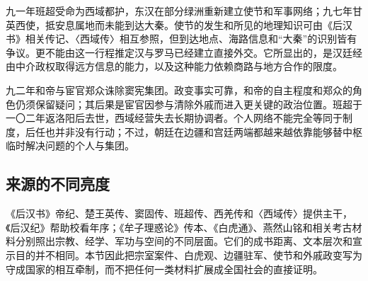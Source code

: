 九一年班超受命为西域都护，东汉在部分绿洲重新建立使节和军事网络；九七年甘英西使，抵安息属地而未能到达大秦。使节的发生和所见的地理知识可由《后汉书》相关传记、〈西域传〉相互参照，但到达地点、海路信息和“大秦”的识别皆有争议。更不能由这一行程推定汉与罗马已经建立直接外交。它所显出的，是汉廷经由中介政权取得远方信息的能力，以及这种能力依赖商路与地方合作的限度。

九二年和帝与宦官郑众诛除窦宪集团。政变事实可靠，和帝的自主程度和郑众的角色仍须保留疑问；其后果是宦官因参与清除外戚而进入更关键的政治位置。班超于一〇二年返洛阳后去世，西域经营失去长期协调者。个人网络不能完全等同于制度，后任也并非没有行动；不过，朝廷在边疆和宫廷两端都越来越依靠能够替中枢临时解决问题的个人与集团。

\subsection{来源的不同亮度}

《后汉书》帝纪、楚王英传、窦固传、班超传、西羌传和〈西域传〉提供主干，《后汉纪》帮助校看年序；《牟子理惑论》传本、《白虎通》、燕然山铭和相关考古材料分别照出宗教、经学、军功与空间的不同层面。它们的成书距离、文本层次和宣示目的并不相同。本节因此把宗室案件、白虎观、边疆驻军、使节和外戚政变写为守成国家的相互牵制，而不把任何一类材料扩展成全国社会的直接证明。

